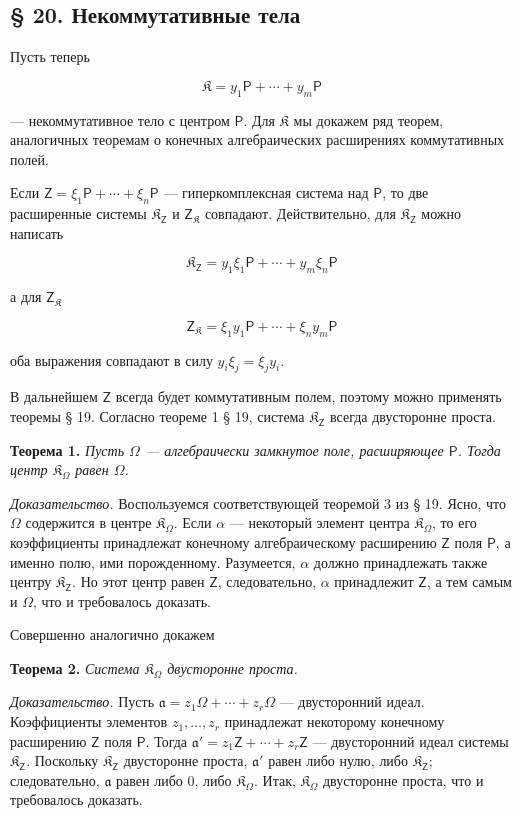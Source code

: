 \documentclass[11pt]{article}
\begin{document}
\subsection*{§ 20. Некоммутативные тела}\label{nichtkommutative-koerper}

Пусть теперь

\[
\mathfrak K=y_1\mathsf P+\cdots+y_m\mathsf P
\]

--- некоммутативное тело с центром \(\mathsf P\). Для \(\mathfrak K\) мы докажем ряд теорем, аналогичных теоремам о конечных алгебраических расширениях коммутативных полей.

Если \(\mathsf{Z}=\xi_1\mathsf P+\cdots+\xi_n\mathsf P\) --- гиперкомплексная система над \(\mathsf P\), то две расширенные системы \(\mathfrak K_{\mathsf{Z}}\) и \(\mathsf{Z}_{\mathfrak K}\) совпадают. Действительно, для \(\mathfrak K_{\mathsf{Z}}\) можно написать

\[
\mathfrak K_{\mathsf{Z}}=y_1\xi_1\mathsf P+\cdots+y_m\xi_n\mathsf P
\]

а для \(\mathsf{Z}_{\mathfrak K}\)

\[
\mathsf{Z}_{\mathfrak K}=\xi_1y_1\mathsf P+\cdots+\xi_ny_m\mathsf P
\]

оба выражения совпадают в силу \(y_i\xi_j=\xi_jy_i\).

В дальнейшем \(\mathsf{Z}\) всегда будет коммутативным полем, поэтому можно применять теоремы § 19. Согласно теореме 1 § 19, система \(\mathfrak K_{\mathsf{Z}}\) всегда двусторонне проста.

\textbf{Теорема 1.} \emph{Пусть \(\Omega\) --- алгебраически замкнутое поле, расширяющее \(\mathsf P\). Тогда центр \(\mathfrak K_\Omega\) равен \(\Omega\).}

\emph{Доказательство.} Воспользуемся соответствующей теоремой 3 из § 19. Ясно, что \(\Omega\) содержится в центре \(\mathfrak K_\Omega\). Если \(\alpha\) --- некоторый элемент центра \(\mathfrak K_\Omega\), то его коэффициенты принадлежат конечному алгебраическому расширению \(\mathsf{Z}\) поля \(\mathsf P\), а именно полю, ими порожденному. Разумеется, \(\alpha\) должно принадлежать также центру \(\mathfrak K_{\mathsf{Z}}\). Но этот центр равен \(\mathsf{Z}\), следовательно, \(\alpha\) принадлежит \(\mathsf{Z}\), а тем самым и \(\Omega\), что и требовалось доказать.

Совершенно аналогично докажем

\textbf{Теорема 2.} \emph{Система \(\mathfrak K_\Omega\) двусторонне проста.}

\emph{Доказательство.} Пусть \(\mathfrak a=z_1\Omega+\cdots+z_r\Omega\) --- двусторонний идеал. Коэффициенты элементов \(z_1,\ldots,z_r\) принадлежат некоторому конечному расширению \(\mathsf{Z}\) поля \(\mathsf P\). Тогда \(\mathfrak a'=z_1\mathsf{Z}+\cdots+z_r\mathsf{Z}\) --- двусторонний идеал системы \(\mathfrak K_{\mathsf{Z}}\). Поскольку \(\mathfrak K_{\mathsf{Z}}\) двусторонне проста, \(\mathfrak a'\) равен либо нулю, либо \(\mathfrak K_{\mathsf{Z}}\); следовательно, \(\mathfrak a\) равен либо 0, либо \(\mathfrak K_\Omega\). Итак, \(\mathfrak K_\Omega\) двусторонне проста, что и требовалось доказать.
\end{document}
